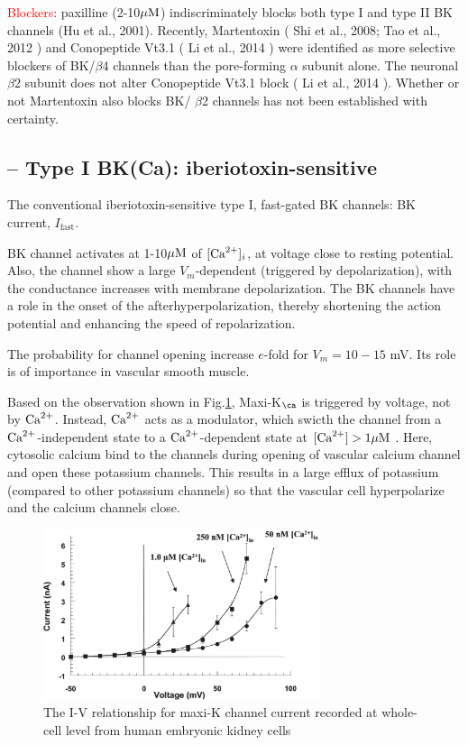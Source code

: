 \textcolor{red}{Blockers}:
paxilline (2-10${\mu\text{M}}$) indiscriminately blocks both type I and type II BK
channels (Hu et al., 2001).
Recently, Martentoxin ( Shi et al., 2008; Tao et al., 2012 ) and Conopeptide
Vt3.1 ( Li et al., 2014 ) were identified as more selective blockers of
BK/$\beta$4 channels than the pore-forming $\alpha$ subunit alone.
The neuronal $\beta$2 subunit does not alter Conopeptide Vt3.1 block ( Li et
al., 2014 ). Whether or not Martentoxin also blocks BK/ $\beta$2 channels has
not been established with certainty.

\subsection{-- Type I BK(Ca): iberiotoxin-sensitive}
\label{sec:BK(Ca)-type-I}

The conventional iberiotoxin-sensitive type I, fast-gated BK channels:
BK current, $I_\text{fast}$.

BK channel activates at 1-10${\mu\text{M}}$ of $[{\text{Ca}^{2+}}]_i$, at voltage close to resting
potential. Also, the channel show a large $V_m$-dependent (triggered by
depolarization), with the conductance increases with membrane depolarization.
The BK channels have a role in the onset of the afterhyperpolarization, thereby
shortening the action potential and enhancing the speed of repolarization.

The probability for channel opening increase $e$-fold for $V_m=10-15$ mV.
Its role is of importance in vascular smooth muscle.

Based on the observation shown in Fig.\ref{fig:MaxiK_Vm-dependent}, Maxi-K$_\ca$
is triggered by voltage, not by ${\text{Ca}^{2+}}$. Instead, ${\text{Ca}^{2+}}$ acts as a modulator, which
swicth the channel from a ${\text{Ca}^{2+}}$-independent state to a ${\text{Ca}^{2+}}$-dependent state at
$[{\text{Ca}^{2+}}]> 1{\mu\text{M}}$ \citep{toro1998}. Here, cytosolic calcium bind to the channels
during opening of vascular calcium channel and open these potassium channels.
This results in a large efflux of potassium (compared to other potassium
channels) so that the vascular cell hyperpolarize and the calcium channels
close.

\begin{figure}[hbt]
  \centerline{\includegraphics[height=5cm,
    angle=0]{./images/MaxiK_Vdependent.eps}}
  \caption{The I-V relationship for maxi-K channel current recorded at
  whole-cell level from human embryonic kidney cells \citep{gribkoff2001}}
\label{fig:MaxiK_Vm-dependent}
\end{figure}

